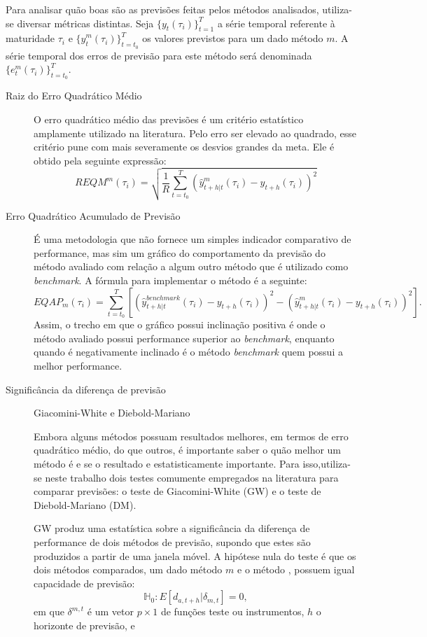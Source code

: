 \documentclass[
	12pt,				%
	openright,			%
	oneside,			%
	a4paper,			%
	english,			%
	brazil				%
	]{dissertacao-ufrgs-abntex2}
\begin{document}
Para analisar quão boas são as previsões feitas pelos métodos analisados, utiliza-se diversar métricas distintas. Seja $\{y_{t}(\tau_i)\}_{t=1}^T$ a série temporal referente à maturidade $\tau_i$ e $\{\hat{y}_{t}^m(\tau_i)\}_{t=t_0}^T$ os valores previstos para um dado método $m$. A série temporal dos erros de previsão para este método será denominada $\{e_{t}^m(\tau_i)\}_{t=t_0}^T$.

\begin{description}
	\item[Raiz do Erro Quadrático Médio] O erro quadrático médio das previsões é um critério estatístico amplamente utilizado na literatura. Pelo erro ser elevado ao quadrado, esse critério pune com mais severamente os desvios grandes da meta. Ele é obtido pela seguinte expressão: \[ REQM^m(\tau_i) = \sqrt{ \frac{1}{R} \sum _{t = t_0}^T (\hat{y}_{t+h|t}^m(\tau_i) - y_{t+h}(\tau_i))^2 } \]
	\item[Erro Quadrático Acumulado de Previsão] É uma metodologia que não fornece um simples indicador comparativo de performance, mas sim um gráfico do comportamento da previsão do método avaliado com relação a algum outro método que é utilizado como \emph{benchmark}. A fórmula para implementar o método é a seguinte:
	\[ EQAP_{m}(\tau_i) = \sum_{t=t_0}^T  \left[ \left( \hat{y}_{t+h|t}^{benchmark}(\tau_i) - y_{t+h}(\tau_i) \right)^2 - \left( \hat{y}_{t+h|t}^m(\tau_i) - y_{t+h}(\tau_i) \right)^2 \right]. \]
Assim, o trecho em que o gráfico possui inclinação positiva é onde o método avaliado possui performance superior ao \emph{benchmark}, enquanto quando é negativamente inclinado é o método \emph{benchmark} quem possui a melhor performance.
	
	\item[Significância da diferença de previsão]
	
	Giacomini-White e Diebold-Mariano

Embora alguns métodos possuam resultados melhores, em termos de erro quadrático médio, do que outros, é importante saber o quão melhor um método é e se o resultado e estatisticamente importante. 
Para isso,utiliza-se neste trabalho dois testes comumente empregados na literatura para comparar previsões: o teste de 
Giacomini-White (GW) e o teste de Diebold-Mariano (DM).

GW produz uma estatística sobre a significância da diferença de performance de dois métodos de previsão, supondo que estes são 
produzidos a partir de uma janela móvel. A hipótese nula do teste é que os dois métodos comparados, um dado método $m$ e o método \bm, possuem igual capacidade de previsão:
\begin{equation}
\mathbb{H}_0:E[d_{a,t+h}|\delta_{m,t}]=0,
\end{equation}
em que $\delta^{m,t}$ é um vetor $p \times 1$ de funções teste ou instrumentos, $h$ o horizonte de previsão, e 


\end{description}
\end{document}
